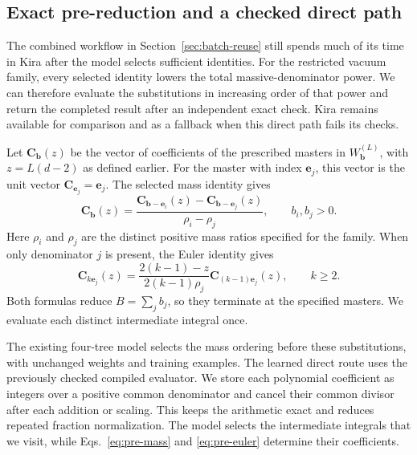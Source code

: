 \subsection{Exact pre-reduction and a checked direct path}
\label{sec:pre-reduction}
The combined workflow in Section~\ref{sec:batch-reuse} still spends much
of its time in Kira after the model selects sufficient identities.
For the restricted vacuum family, every selected identity lowers the total
massive-denominator power. We can therefore evaluate the substitutions
in increasing order of that power and return the completed result after
an independent exact check. Kira remains available for comparison and
as a fallback when this direct path fails its checks.

Let \(\boldsymbol C_{\boldsymbol b}(z)\) be the vector of coefficients
of the prescribed masters in \(W_{\boldsymbol b}^{(L)}\), with
\(z=L(d-2)\) as defined earlier. For the master with index
\(\boldsymbol e_j\), this vector is the unit vector
\(\boldsymbol C_{\boldsymbol e_j}=\boldsymbol e_j\).
The selected mass identity gives
\begin{equation}
 \boldsymbol C_{\boldsymbol b}(z)=
 \frac{\boldsymbol C_{\boldsymbol b-\boldsymbol e_i}(z)
       -\boldsymbol C_{\boldsymbol b-\boldsymbol e_j}(z)}
      {\rho_i-\rho_j},
 \qquad b_i,b_j>0.
 \label{eq:pre-mass}
\end{equation}
Here \(\rho_i\) and \(\rho_j\) are the distinct positive mass ratios
specified for the family. When only denominator \(j\) is present,
the Euler identity gives
\begin{equation}
 \boldsymbol C_{k\boldsymbol e_j}(z)
 =\frac{2(k-1)-z}{2(k-1)\rho_j}
   \boldsymbol C_{(k-1)\boldsymbol e_j}(z),
 \qquad k\geq 2.
 \label{eq:pre-euler}
\end{equation}
Both formulas reduce \(B=\sum_j b_j\), so they terminate at the
specified masters. We evaluate each distinct intermediate integral once.

The existing four-tree model selects the mass ordering before these
substitutions, with unchanged weights and training examples.
The learned direct route uses the previously checked compiled evaluator.
We store each polynomial coefficient as integers over a positive common
denominator and cancel their common divisor after each addition or scaling. This keeps the arithmetic exact and reduces
repeated fraction normalization. The model selects the intermediate
integrals that we visit, while Eqs.~\eqref{eq:pre-mass} and
\eqref{eq:pre-euler} determine their coefficients.

